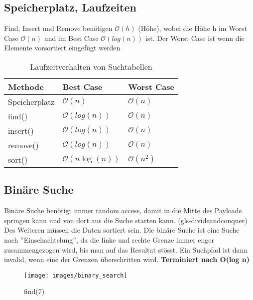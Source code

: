 \subsection{Speicherplatz, Laufzeiten}
Find, Insert und Remove benötigen $\mathcal{O}(h)$ (Höhe), wobei die Höhe h im Worst Case $\mathcal{O}(n)$ und im Best Case $\mathcal{O}(log(n))$ ist. Der Worst Case ist wenn die Elemente vorsortiert eingefügt werden
\begin{table}[h]
	\centering
	\begin{tabu} to \linewidth {l l l}
		\toprule
		Methode & Best Case  & Worst Case \\
		\midrule
		Speicherplatz & $\mathcal{O}(n)$ & $\mathcal{O}(n)$ \\
		find() & $\mathcal{O}(log(n))$ &  $\mathcal{O}(n)$ \\
		insert() & $\mathcal{O}(log(n))$ & $\mathcal{O}(n)$ \\
		remove() & $\mathcal{O}(log(n))$ & $\mathcal{O}(n)$ \\
		sort()  & $\mathcal{O}(n\log(n))$ & $\mathcal{O}(n^2)$ \\
		\bottomrule
	\end{tabu}
	\caption{Laufzeitverhalten von Suchtabellen}
\end{table}
\clearpage

\subsection{Binäre Suche}
Binäre Suche benötigt immer random access, damit in die Mitte des Payloads springen kann und von dort aus die Suche starten kann. (\gls{gls-divideandconquer}) Des Weiteren müssen die Daten sortiert sein. Die binäre Suche ist eine Suche nach ''Einschachtelung'', da die linke und rechte Grenze immer enger zusammengezogen wird, bis man auf das Resultat stösst. Ein Suchpfad ist dann invalid, wenn eine der Grenzen überschritten wird.
\textbf{Terminiert nach O(log n)}
\begin{figure}[ht!]
		\centering
		\begin{minipage}[t]{0.4\textwidth}
			\centering
			\texttt{[image: images/binary\_search]}
			\caption{find(7)}
			\label{fig:binary search divide and conquer}
		\end{minipage}
	\end{figure}
\clearpage

